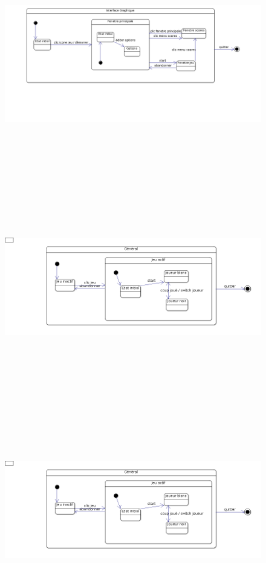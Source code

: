 \begin{figure}[ht]
\begin{center}
  \includegraphics[width = 35em, height=25em]{images/plop/plop1.png}
\end{center}
\end{figure}

\begin{figure}[ht]
\begin{center}
  \includegraphics[width = 35em, height=25em]{images/plop/plop3.png}
\end{center}
\end{figure}

\begin{figure}[ht]
\begin{center}
  \includegraphics[width = 35em, height=25em]{images/plop/plop3.png}
\end{center}
\end{figure}